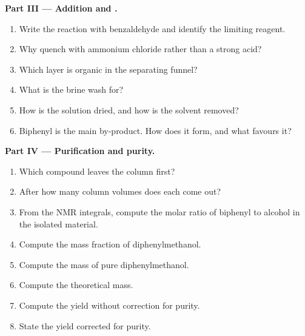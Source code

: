 \begin{problem}
\medskip
\noindent\textbf{Part III --- Addition and .}
\begin{enumerate}[resume]
  \item Write the reaction with benzaldehyde and identify the limiting reagent.
  \item Why quench with ammonium chloride rather than a strong acid?
  \item Which layer is organic in the separating funnel?
  \item What is the brine wash for?
  \item How is the solution dried, and how is the solvent removed?
  \item Biphenyl is the main by-product. How does it form, and what favours it?
\end{enumerate}

\medskip
\noindent\textbf{Part IV --- Purification and purity.}
\begin{enumerate}[resume]
  \item Which compound leaves the column first?
  \item After how many column volumes does each come out?
  \item From the NMR integrals, compute the molar ratio of biphenyl to alcohol in the isolated
        material.
  \item Compute the mass fraction of diphenylmethanol.
  \item Compute the mass of pure diphenylmethanol.
  \item Compute the theoretical mass.
  \item Compute the yield without correction for purity.
  \item State the yield corrected for purity.
\end{enumerate}
\end{problem}

